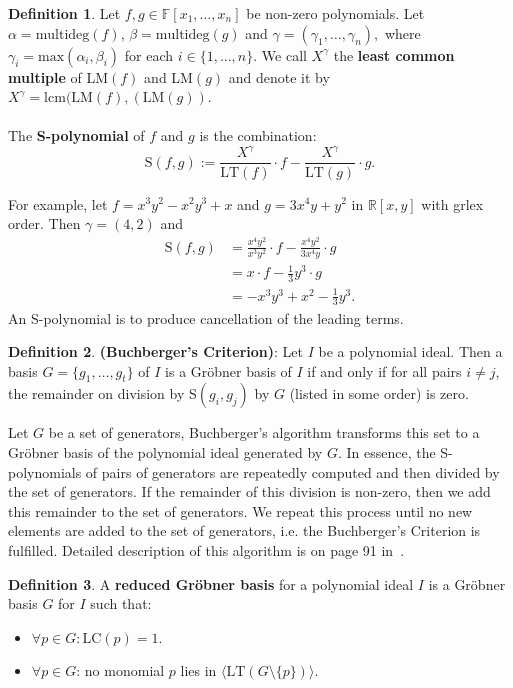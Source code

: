 \documentclass[thesis=M,english]{FITthesis}[2012/10/20]
\theoremstyle{remark}
\theoremstyle{definition}
\newtheorem{DF}{Definition}[section]
\begin{document}
\begin{DF}
Let $f,g \in \mathbb{F}[x_1,\ldots,x_n]$ be non-zero polynomials. Let $\alpha = \text{multideg}(f)$, $\beta = \text{multideg}(g)$ and ${\gamma = (\gamma_1,\ldots,\gamma_n)},$ where ${\gamma_i = \text{max}(\alpha_i,\beta_i)}$ for each $i \in \{1,\ldots,n\}.$ We call $X^\gamma$ the \textbf{least common multiple} of LM$(f)$ and LM$(g)$ and denote it by $X^\gamma = \text{lcm(LM}(f),(\text{LM}(g)).$ \\ \\
\noindent The \textbf{S-polynomial} of $f$ and $g$ is the combination:
$$
\text{S}(f,g) := \frac{X^\gamma}{\text{LT}(f)}\cdot f - \frac{X^\gamma}{\text{LT}(g)}\cdot g.
$$
\end{DF}
\noindent For example, let $f=x^3y^2 - x^2y^3 + x$ and $g = 3x^4y + y^2$ in $\mathbb{R}[x,y]$ with grlex order. Then $\gamma = (4,2)$ and
\begin{align*}
\text{S}(f,g) &= \frac{x^4y^2}{x^3y^2}\cdot f - \frac{x^4y^2}{3x^4y}\cdot g \\
&= x\cdot f - \frac{1}{3}y^3\cdot g \\
&= -x^3y^3 + x^2 - \frac{1}{3}y^3.
\end{align*}
An S-polynomial is  to produce cancellation of the leading terms.
\begin{DF}
\textbf{(Buchberger's Criterion)}: Let $I$ be a polynomial ideal. Then a basis $G = \{g_1,\ldots,g_t\}$ of $I$ is a Gröbner basis of $I$ if and only if for all pairs $i\neq j$, the remainder on division by S$(g_i,g_j)$ by $G$ (listed in some order) is zero.
\end{DF}
\noindent Let $G$ be a set of generators, Buchberger's algorithm transforms this set to a Gröbner basis of the polynomial ideal generated by $G$. In essence, the S-polynomials of pairs of generators are repeatedly computed and then divided by the set of generators. If the remainder of this division is non-zero, then we add this remainder to the set of generators. We repeat this process until no new elements are added to the set of generators, i.e. the Buchberger's Criterion is fulfilled. Detailed description of this algorithm is on page 91 in~\cite{algGeom}.
\begin{DF}
A \textbf{reduced Gröbner basis} for a polynomial ideal $I$ is a Gröbner basis $G$ for $I$ such that:
\begin{itemize}
\item $\forall p \in G: \text{LC}(p) = 1.$
\item $\forall p \in G$: no monomial $p$ lies in $\langle\text{LT}(G \setminus \{p\}) \rangle.$
\end{itemize}
\end{DF}
\end{document}
